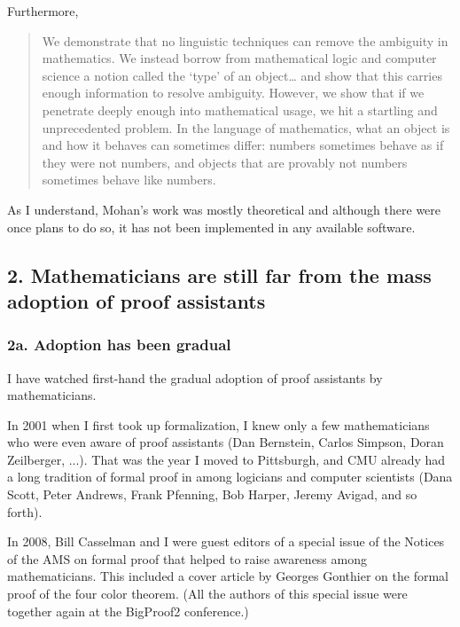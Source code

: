 \documentclass[12pt]{amsart}
\renewcommand{\~}{\ }
\renewcommand{\_}{\textunderscore}
\begin{document}
Furthermore,

\begin{quote}
  We demonstrate that no linguistic techniques can remove the
  ambiguity in mathematics. We instead borrow from mathematical logic
  and computer science a notion called the `type' of an object\ldots
  and show that this carries enough information to resolve
  ambiguity.  However, we show that if we penetrate deeply enough into
  mathematical usage, we hit a startling and unprecedented problem. In
  the language of mathematics, what an object is and how it behaves
  can sometimes differ: numbers sometimes behave as if they were not
  numbers, and objects that are provably not numbers sometimes behave
  like numbers.
\end{quote}

As I understand, Mohan's work was mostly theoretical and
although there were once plans to do so, it has not been
implemented in any available software.


\subsection*{2. Mathematicians are still far from the mass adoption
of  proof assistants}

\subsubsection*{2a. Adoption has been gradual}
I have watched first-hand the gradual adoption of proof assistants by
mathematicians.

In 2001 when I first took up formalization, I knew only a few
mathematicians who were even aware of proof assistants (Dan Bernstein,
Carlos Simpson, Doran Zeilberger, ...).  That was the year I moved to
Pittsburgh, and CMU already had a long tradition of formal proof in
among logicians and computer scientists (Dana Scott, Peter Andrews,
Frank Pfenning, Bob Harper, Jeremy Avigad, and so forth).

In 2008, Bill Casselman and I were guest editors of a special issue of
the Notices of the AMS on formal proof that helped to raise awareness among
mathematicians.  This included a cover article by Georges Gonthier on
the formal proof of the four color theorem. (All the authors of this
special issue were together again at the BigProof2 conference.)
\end{document}

